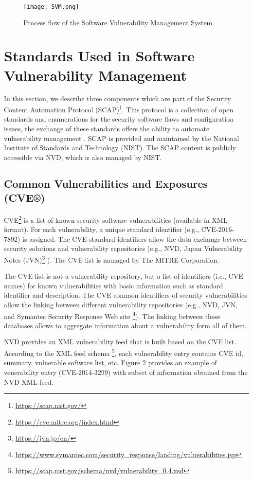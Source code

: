 \documentclass{llncs}
\begin{document}
\begin{figure}
 
  \centering
    \texttt{[image: SVM.png]}
     \caption{Process flow of the Software Vulnerability Management System.}
\end{figure}

\section{Standards	Used	in	Software	Vulnerability	Management}
 
 In	this section, we describe three	components which are part of the Security	 Content	Automation	Protocol (SCAP)\footnote{\url{https://scap.nist.gov/}}. This protocol is a collection of open standards and enumerations for the	security  software flaws	 and configuration issues, the exchange of these	standards	offers	the	ability	to	automate	vulnerability	management \cite{scap_doc}.		
 SCAP is provided	and	maintained	by	the	National	Institute	of	Standards	and	Technology (NIST). The SCAP	content	is	publicly accessible via  NVD, which is also managed	by NIST.
 
 
 \subsection{Common Vulnerabilities and Exposures (CVE®)} 
 CVE\footnote{\url{https://cve.mitre.org/index.html}} is a list of known security software vulnerabilities (available in XML format). For each vulnerability, a unique standard identifier (e.g., CVE-2016-7892) is assigned. The CVE standard identifiers allow the data exchange between security solutions and vulnerability repositories (e.g., NVD, Japan Vulnerability Notes (JVN)\footnote{\url{https://jvn.jp/en/}} ). The CVE list is managed by The MITRE Corporation.

 The CVE list is not a vulnerability repository, but a list of identifiers (i.e., CVE names) for  known vulnerabilities with basic information such as standard identifier and description. The CVE common identifiers of security vulnerabilities allow the linking between different vulnerability repositories (e.g., NVD, JVN, and Symantec Security Response Web site \footnote{\url{https://www.symantec.com/security_response/landing/vulnerabilities.jsp}}). The linking between these databases allows to aggregate information about a vulnerability form all of them. 
 
 NVD provides an XML vulnerability feed that is built based on the CVE list. According to the XML feed schema \footnote{\url{https://scap.nist.gov/schema/nvd/vulnerability_0.4.xsd}}, each vulnerability entry contains CVE id, summary, vulnerable software list, etc. Figure 2 provides an example of venerability entry (CVE-2014-3299) with subset of information obtained from the NVD XML feed.
\end{document}
